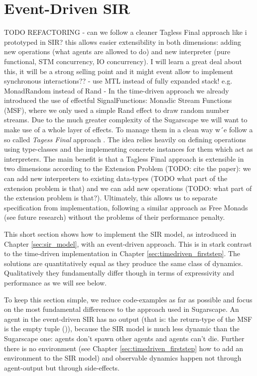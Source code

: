 \section{Event-Driven SIR}
\label{sec:eventdriven_sir}
TODO REFACTORING
- can we follow a cleaner Tagless Final approach like i prototyped in SIR? this allows easier extensibility in both dimensions: adding new operations (what agents are allowed to do) and new interpreter (pure functional, STM concurrency, IO concurrency). I will learn a great deal about this, it will be a strong selling point and it might event allow to implement synchronous interactions?? 
- use MTL instead of fully expanded stack! e.g. MonadRandom instead of Rand
- In the time-driven approach we already introduced the use of effectful SignalFunctions: Monadic Stream Functions (MSF), where we only used a simple Rand effect to draw random number streams. Due to the much greater complexity of the Sugarscape we will want to make use of a whole layer of effects. To manage them in a clean way w´e follow a so called \textit{Tagess Final} approach \cite{kiselyov_typed_2012}. The idea relies heavily on defining operations using type-classes and the implementing concrete instances for them which act as interpreters. The main benefit is that a Tagless Final approach is extensible in two dimensions according to the Extension Problem (TODO: cite the paper): we can add new interpreters to existing data-types (TODO what part of the extension problem is that) and we can add new operations (TODO: what part of the extension problem is that?). Ultimately, this allows us to separate specification from implementation, following a similar approach as Free Monads (see future research) without the problems of their performance penalty.

This short section shows how to implement the SIR model, as introduced in Chapter \ref{sec:sir_model}, with an event-driven approach. This is in stark contrast to the time-driven implementation in Chapter \ref{sec:timedriven_firststep}. The solutions are quantitatively equal as they produce the same class of dynamics. Qualitatively they fundamentally differ though in terms of expressivity and performance as we will see below.

To keep this section simple, we reduce code-examples as far as possible and focus on the most fundamental differences to the approach used in Sugarscape. An agent in the event-driven SIR has no output (that is: the return-type of the MSF is the empty tuple ()), because the SIR model is much less dynamic than the Sugarscape one: agents don't spawn other agents and agents can't die. Further there is no environment (see Chapter \ref{sec:timedriven_firststep} how to add an environment to the SIR model) and observable dynamics happen not through agent-output but through side-effects.

